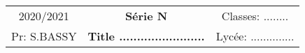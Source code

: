\documentclass[a4paper,12pt]{report}
\begin{document}
\begin{center}
\begin{tcolorbox}[enhanced,arc=3mm,boxrule=1.5mm,boxsep=1.5mm,
	colback=yellow!15!white,
	colframe=black,
	borderline={1mm}{1mm}{white},
	borderline={1mm}{2mm}{red!50!black} ]


	\begin{tabular}{c c  c}
		2020/2021 	\hspace*{1.5cm}   & \textbf{{\huge Série N  }} & 	\hspace*{1.5cm} Classes: ........			\\
		Pr: S.BASSY\hspace*{1.5cm} &{\huge \textbf{ Title ........................}} & \hspace*{1cm}Lycée: ..............	\end{tabular}

\end{tcolorbox}

\end{center}
\end{document}
